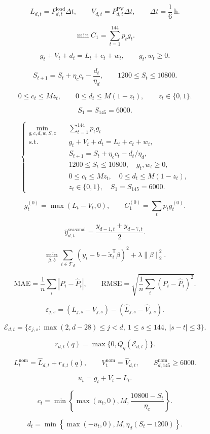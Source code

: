 \[
L_{d,t}=P^{\mathrm{load}}_{d,t}\Delta t,\qquad V_{d,t}=P^{\mathrm{PV}}_{d,t}\Delta t,\qquad \Delta t=\frac{1}{6}\ \mathrm{h}.
\]

\[
\min C_1=\sum_{t=1}^{144}p_tg_t.
\]

\[
g_t+V_t+d_t=L_t+c_t+w_t,\qquad g_t,w_t\geq0.
\]

\[
S_{t+1}=S_t+\eta_c c_t-\frac{d_t}{\eta_d},\qquad 1200\leq S_t\leq10800.
\]

\[
0\leq c_t\leq Mz_t,\qquad 0\leq d_t\leq M(1-z_t),\qquad z_t\in\{0,1\}.
\]

\[
S_1=S_{145}=6000.
\]

\[
\boxed{\left\{\begin{aligned}\min_{g,c,d,w,S,z}\quad &\sum_{t=1}^{144}p_tg_t\\\mathrm{s.t.}\quad &g_t+V_t+d_t=L_t+c_t+w_t,\\&S_{t+1}=S_t+\eta_c c_t-d_t/\eta_d,\\&1200\leq S_t\leq10800,\quad g_t,w_t\geq0,\\&0\leq c_t\leq Mz_t,\quad0\leq d_t\leq M(1-z_t),\\&z_t\in\{0,1\},\quad S_1=S_{145}=6000.\end{aligned}\right.}
\]

\[
g_t^{(0)}=\max(L_t-V_t,0),\qquad C_1^{(0)}=\sum_t p_tg_t^{(0)}.
\]

\[
\hat y_{d,t}^{\mathrm{seasonal}}=\frac{y_{d-1,t}+y_{d-7,t}}{2}.
\]

\[
\min_{\beta,b}\sum_{i\in\mathcal T_d}(y_i-b-\widetilde{x}_i^{\mathsf T}\beta)^2+\lambda\|\beta\|_2^2.
\]

\[
\mathrm{MAE}=\frac{1}{n}\sum_i|P_i-\widehat P_i|,\qquad\mathrm{RMSE}=\sqrt{\frac{1}{n}\sum_i(P_i-\widehat P_i)^2}.
\]

\[
\varepsilon_{j,s}=(L_{j,s}-V_{j,s})-(\hat L_{j,s}-\hat V_{j,s}).
\]

\[
\mathcal E_{d,t}=\{\varepsilon_{j,s}:\max(2,d-28)\leq j<d,\ 1\leq s\leq144,\ |s-t|\leq3\}.
\]

\[
r_{d,t}(q)=\max\{0,Q_q(\mathcal E_{d,t})\}.
\]

\[
L_t^{\mathrm{nom}}=\hat L_{d,t}+r_{d,t}(q),\qquad V_t^{\mathrm{nom}}=\hat V_{d,t},\qquad S_{d,145}^{\mathrm{nom}}\geq6000.
\]

\[
u_t=g_t+V_t-L_t.
\]

\[
c_t=\min\left\{\max(u_t,0),M,\frac{10800-S_t}{\eta_c}\right\}.
\]

\[
d_t=\min\left\{\max(-u_t,0),M,\eta_d(S_t-1200)\right\}.
\]

